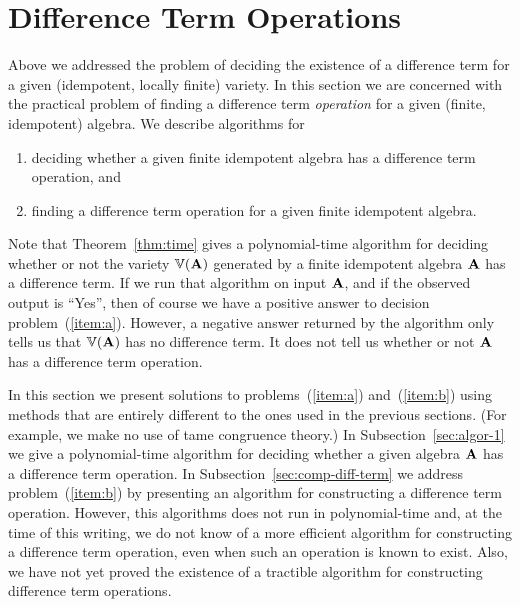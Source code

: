 \section{Difference Term Operations}
Above we addressed the problem of deciding the existence of a difference term 
for a given (idempotent, locally finite) variety.  In this section we are 
concerned with the practical problem of finding a difference term 
\emph{operation} for a given (finite, idempotent) algebra.
We describe algorithms for
\begin{enumerate}
\item \label{item:a} deciding whether a given finite idempotent algebra 
has a difference term operation, and 
\item \label{item:b} finding a difference term operation 
for a given finite idempotent algebra.
\end{enumerate}
Note that Theorem~\ref{thm:time} gives a polynomial-time algorithm
for deciding whether or not the variety $\operatorname{\mathbb{V}}(\mathbf{A})$ generated by a 
finite idempotent algebra $\mathbf{A}$ has a difference term.
If we run that algorithm on input $\mathbf{A}$, and if the observed
output is ``Yes'', then of course we have a positive answer to decision 
problem~(\ref{item:a}).  However, a negative answer returned by the 
algorithm only tells us that $\operatorname{\mathbb{V}}(\mathbf{A})$ has no difference term.  
It does not tell us whether or not $\mathbf{A}$ has a difference term operation.

\medskip


\medskip

In this section we present solutions to problems~(\ref{item:a}) and~(\ref{item:b})
using methods that are entirely different to the ones used in the previous
sections. 
(For example, we make no use of tame congruence theory.)  
In Subsection~\ref{sec:algor-1} we give a polynomial-time algorithm
for deciding whether a given algebra $\mathbf{A}$ has a difference term operation.
In Subsection~\ref{sec:comp-diff-term} we address problem~(\ref{item:b})
by presenting an algorithm for constructing a difference term operation.  
However, this algorithms does not run in polynomial-time and, at the time 
of this writing, we do not know of a more efficient algorithm for constructing a difference term operation, even when such an operation is known to exist. 
Also, we have not yet proved the existence of a tractible algorithm for constructing difference term operations.

